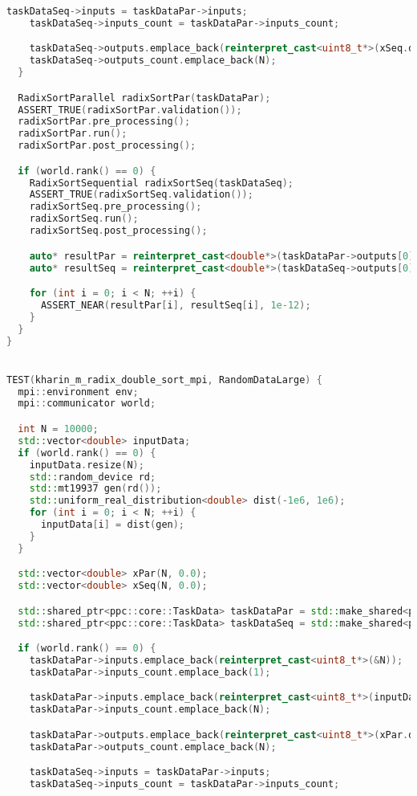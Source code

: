 \documentclass[a4paper,12pt]{article}
\begin{document}
\begin{lstlisting}[language=C++, caption={Тесты}]
    taskDataSeq->inputs = taskDataPar->inputs;
    taskDataSeq->inputs_count = taskDataPar->inputs_count;

    taskDataSeq->outputs.emplace_back(reinterpret_cast<uint8_t*>(xSeq.data()));
    taskDataSeq->outputs_count.emplace_back(N);
  }

  RadixSortParallel radixSortPar(taskDataPar);
  ASSERT_TRUE(radixSortPar.validation());
  radixSortPar.pre_processing();
  radixSortPar.run();
  radixSortPar.post_processing();

  if (world.rank() == 0) {
    RadixSortSequential radixSortSeq(taskDataSeq);
    ASSERT_TRUE(radixSortSeq.validation());
    radixSortSeq.pre_processing();
    radixSortSeq.run();
    radixSortSeq.post_processing();

    auto* resultPar = reinterpret_cast<double*>(taskDataPar->outputs[0]);
    auto* resultSeq = reinterpret_cast<double*>(taskDataSeq->outputs[0]);

    for (int i = 0; i < N; ++i) {
      ASSERT_NEAR(resultPar[i], resultSeq[i], 1e-12);
    }
  }
}


TEST(kharin_m_radix_double_sort_mpi, RandomDataLarge) {
  mpi::environment env;
  mpi::communicator world;

  int N = 10000;
  std::vector<double> inputData;
  if (world.rank() == 0) {
    inputData.resize(N);
    std::random_device rd;
    std::mt19937 gen(rd());
    std::uniform_real_distribution<double> dist(-1e6, 1e6);
    for (int i = 0; i < N; ++i) {
      inputData[i] = dist(gen);
    }
  }

  std::vector<double> xPar(N, 0.0);
  std::vector<double> xSeq(N, 0.0);

  std::shared_ptr<ppc::core::TaskData> taskDataPar = std::make_shared<ppc::core::TaskData>();
  std::shared_ptr<ppc::core::TaskData> taskDataSeq = std::make_shared<ppc::core::TaskData>();

  if (world.rank() == 0) {
    taskDataPar->inputs.emplace_back(reinterpret_cast<uint8_t*>(&N));
    taskDataPar->inputs_count.emplace_back(1);

    taskDataPar->inputs.emplace_back(reinterpret_cast<uint8_t*>(inputData.data()));
    taskDataPar->inputs_count.emplace_back(N);

    taskDataPar->outputs.emplace_back(reinterpret_cast<uint8_t*>(xPar.data()));
    taskDataPar->outputs_count.emplace_back(N);

    taskDataSeq->inputs = taskDataPar->inputs;
    taskDataSeq->inputs_count = taskDataPar->inputs_count;


\end{lstlisting}
\end{document}
